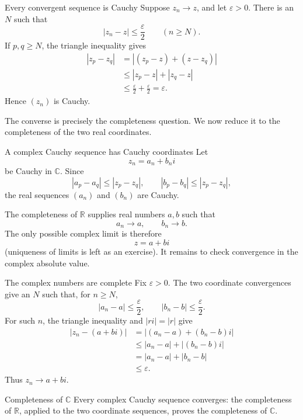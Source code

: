 \documentclass[aspectratio=169,11pt]{beamer}
\newcommand{\R}{\mathbb R}
\newcommand{\C}{\mathbb C}
\begin{document}
\begin{frame}{Every convergent sequence is Cauchy}
  Suppose \(z_n\to z\), and let \(\varepsilon>0\).  There is an
  \(N\) such that
  \[
    |z_n-z|\le\frac\varepsilon2
    \qquad(n\ge N).
  \]
  If \(p,q\ge N\), the triangle inequality gives
  \begin{align*}
    |z_p-z_q|
      &=|(z_p-z)+(z-z_q)|\\
      &\le|z_p-z|+|z_q-z|\\
      &\le\frac\varepsilon2+\frac\varepsilon2
       =\varepsilon.
  \end{align*}
  Hence \((z_n)\) is Cauchy.

  The converse is precisely the completeness question.  We now reduce it to
  the completeness of the two real coordinates.
\end{frame}

\begin{frame}{A complex Cauchy sequence has Cauchy coordinates}
  Let
  \[
    z_n=a_n+b_ni
  \]
  be Cauchy in \(\C\).  Since
  \[
    |a_p-a_q|
      \le |z_p-z_q|,
    \qquad
    |b_p-b_q|
      \le |z_p-z_q|,
  \]
  the real sequences \((a_n)\) and \((b_n)\) are Cauchy.

  The completeness of \(\R\) supplies real numbers \(a,b\) such that
  \[
    a_n\longrightarrow a,
    \qquad
    b_n\longrightarrow b.
  \]
  The only possible complex limit is therefore
  \[
    z=a+bi
  \]
  (uniqueness of limits is left as an exercise).
  It remains to check convergence in the complex absolute value.
\end{frame}

\begin{frame}{The complex numbers are complete}
  Fix \(\varepsilon>0\).  The two coordinate convergences give an \(N\) such
  that, for \(n\ge N\),
  \[
    |a_n-a|\le\frac\varepsilon2,
    \qquad
    |b_n-b|\le\frac\varepsilon2.
  \]
  For such \(n\), the triangle inequality and \(|ri|=|r|\) give
  \begin{align*}
    |z_n-(a+bi)|
      &=|(a_n-a)+(b_n-b)i|\\
      &\le|a_n-a|+|(b_n-b)i|\\
      &=|a_n-a|+|b_n-b|\\
      &\le\varepsilon.
  \end{align*}
  Thus \(z_n\to a+bi\).

  \begin{alertblock}{Completeness of \(\C\)}
    Every complex Cauchy sequence converges: the completeness of \(\R\),
    applied to the two coordinate sequences, proves the completeness of
    \(\C\).
  \end{alertblock}
\end{frame}
\end{document}
